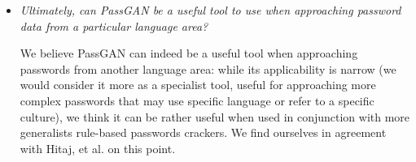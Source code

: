 \begin{itemize}
\item \emph{Ultimately, can PassGAN be a useful tool to use when approaching password data from a particular language area?} %

We believe PassGAN can indeed be a useful tool when approaching passwords from another language area: while its applicability is narrow (we would consider it more as a specialist tool, useful for approaching more complex passwords that may use specific language or refer to a specific culture), we think it can be rather useful when used in conjunction with more generalists rule-based passwords crackers. We find ourselves in agreement with Hitaj, et al. on this point.    
\end{itemize}

